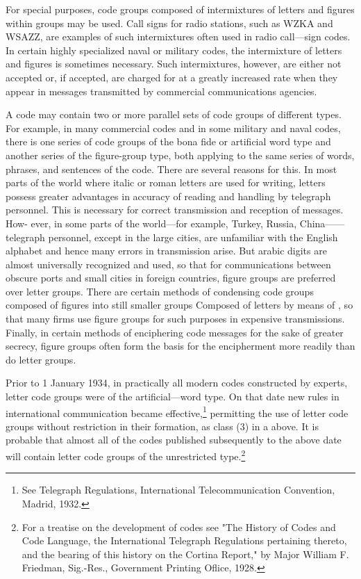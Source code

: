 \mypara For special purposes, code groups composed of intermixtures of
letters and ﬁgures within groups may be used. Call signs for radio
stations, such as WZKA and WSAZZ, are examples of such intermixtures often used in radio call—sign codes. In certain highly specialized
naval or military codes, the intermixture of letters and ﬁgures is sometimes necessary. Such intermixtures, however, are either not accepted or,
if accepted, are charged for at a greatly increased rate when they appear
in messages transmitted by commercial communications agencies.

\mypara A code may contain two or more parallel sets of code groups of
different types. For example, in many commercial codes and in some
military and naval codes, there is one series of code groups of the bona
ﬁde or artiﬁcial word type and another series of the ﬁgure-group type,
both applying to the same series of words, phrases, and sentences of the
code. There are several reasons for this. In most parts of the world where
italic or roman letters are used for writing, letters possess greater advantages in accuracy of reading and handling by telegraph personnel. This
is necessary for correct transmission and reception of messages. How-
ever, in some parts of the world—for example, Turkey, Russia, China——
telegraph personnel, except in the large cities, are unfamiliar with the
English alphabet and hence many errors in transmission arise. But arabic
digits are almost universally recognized and used, so that for communications between obscure ports and small cities in foreign countries, ﬁgure
groups are preferred over letter groups. There are certain methods of
condensing code groups composed of ﬁgures into still smaller groups
Composed of letters by means of , so that many ﬁrms use
ﬁgure groups for such purposes in expensive transmissions. Finally, in
certain methods of enciphering code messages for the sake of greater
secrecy, ﬁgure groups often form the basis for the encipherment more
readily than do letter groups.

\mypara Prior to 1 January 1934, in practically all modern codes constructed
by experts, letter code groups were of the artiﬁcial—word type. On that
date new rules in international communication became effective,\footnote{See Telegraph Regulations, International Telecommunication Convention, Madrid, 1932.} permitting the use of letter code groups without restriction in their formation,
as class (3) in a above. It is probable that almost all of the codes published subsequently to the above date will contain letter code groups of
the unrestricted type.\footnote{For a treatise on the development of codes see "The History of Codes and Code Language, the International Telegraph Regulations pertaining thereto, and the bearing of this history on the Cortina Report," by Major William F. Friedman, Sig.-Res., Government Printing Oﬂice, 1928.}

